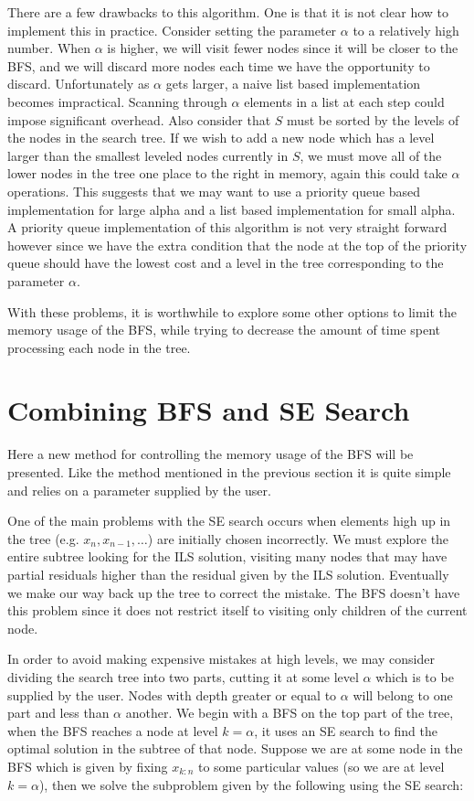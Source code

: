 \documentclass[12pt,Bold,letterpaper]{mcgilletdclass}
\newcommand{\vsp}{\vspace{\baselineskip}}
\begin{document}
There are a few drawbacks to this algorithm. One is that it is not clear how to implement this in practice. Consider setting the parameter $\alpha$ to a relatively high number. When $\alpha$ is higher, we will visit fewer nodes since it will be closer to the BFS, and we will discard more nodes each time we have the opportunity to discard. Unfortunately as $\alpha$ gets larger, a naive list based implementation becomes impractical. Scanning through $\alpha$ elements in a list at each step could impose significant overhead. Also consider that $S$ must be sorted by the levels of the nodes in the search tree. If we wish to add a new node which has a level larger than the smallest leveled nodes currently in $S$, we must move all of the lower nodes in the tree one place to the right in memory, again this could take $\alpha$ operations. This suggests that we may want to use a priority queue based implementation for large alpha and a list based implementation for small alpha. A priority queue implementation of this algorithm is not very straight forward however since we have the extra condition that the node at the top of the priority queue should have the lowest cost and a level in the tree corresponding to the parameter $\alpha$. 

With these problems, it is worthwhile to explore some other options to limit the memory usage of the BFS, while trying to decrease the amount of time spent processing each node in the tree.

\vsp \section{Combining BFS and SE Search}

Here a new method for controlling the memory usage of the BFS will be presented. Like the method mentioned in the previous section \cite{StuBF07} it is quite simple and relies on a parameter supplied by the user.

One of the main problems with the SE search occurs when elements high up in the tree (e.g. $x_n, x_{n-1} , \dots$) are initially chosen incorrectly. We must explore the entire subtree looking for the ILS solution, visiting many nodes that may have partial residuals higher than the residual given by the ILS solution. Eventually we make our way back up the tree to correct the mistake. The BFS doesn't have this problem since it does not restrict itself to visiting only children of the current node.

In order to avoid making expensive mistakes at high levels, we may consider dividing the search tree into two parts, cutting it at some level $\alpha$ which is to be supplied by the user. Nodes with depth greater or equal to $\alpha$ will belong to one part and less than $\alpha$ another. We begin with a BFS on the top part of the tree, when the BFS reaches a node at level $k=\alpha$, it uses an SE search to find the optimal solution in the subtree of that node. Suppose we are at some node in the BFS which is given by fixing $x_{k:n}$ to some particular values (so we are at level $k=\alpha$), then we solve the subproblem  given by the following using the SE search:
\end{document}
